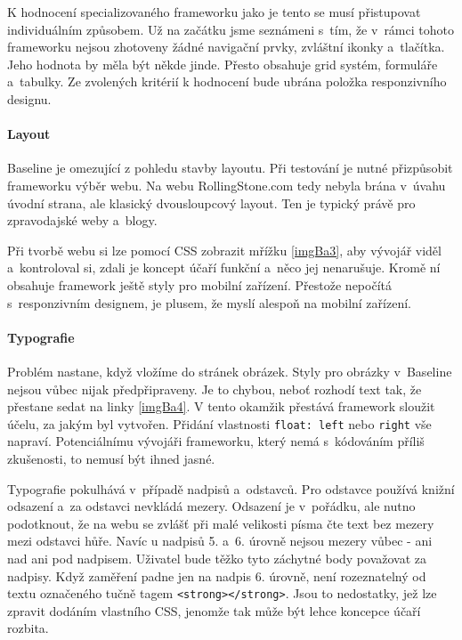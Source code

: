 \documentclass[thesis=B,czech]{FITthesis}[2012/06/26]
\begin{document}
K hodnocení specializovaného frameworku jako je tento se musí přistupovat individuálním způsobem. Už na začátku jsme seznámeni s~tím, že v~rámci tohoto frameworku nejsou zhotoveny žádné navigační prvky, zvláštní ikonky a~tlačítka. Jeho hodnota by měla být někde jinde. Přesto obsahuje grid  systém, formuláře a~tabulky. Ze zvolených kritérií k hodnocení bude ubrána položka responzivního designu.

\paragraph{Layout}

Baseline je omezující z pohledu stavby layoutu. Při testování je nutné přizpůsobit frameworku výběr webu. Na webu RollingStone.com tedy nebyla brána v~úvahu úvodní strana, ale klasický dvousloupcový layout. Ten je typický právě pro zpravodajské weby a~blogy.

Při tvorbě webu si lze pomocí CSS zobrazit mřížku \ref{imgBa3}, aby vývojář viděl a~kontroloval si, zdali je koncept účaří funkční a~něco jej nenarušuje. Kromě ní obsahuje framework ještě styly pro mobilní zařízení. Přestože nepočítá s~responzivním designem, je plusem, že myslí alespoň na mobilní zařízení. 



\paragraph{Typografie}

Problém nastane, když vložíme do stránek obrázek. Styly pro obrázky v~Baseline nejsou vůbec nijak předpřipraveny. Je to chybou, neboť rozhodí text tak, že přestane sedat na linky \ref{imgBa4}. V tento okamžik přestává framework sloužit účelu, za jakým byl vytvořen. Přidání vlastnosti \verb#float: left# nebo \verb#right# vše napraví. Potenciálnímu vývojáři frameworku, který nemá s~kódováním příliš zkušenosti, to nemusí být ihned jasné. 


Typografie pokulhává v~případě nadpisů a~odstavců. Pro odstavce používá knižní odsazení a~za odstavci nevkládá mezery. Odsazení je v~pořádku, ale nutno podotknout, že na webu se zvlášť při malé velikosti písma čte text bez mezery mezi odstavci hůře. Navíc u nadpisů 5. a~6. úrovně nejsou mezery vůbec - ani nad ani pod nadpisem. Uživatel bude těžko tyto záchytné body považovat za nadpisy. Když zaměření padne jen na nadpis 6. úrovně, není rozeznatelný od textu označeného tučně tagem \verb#<strong></strong>#. Jsou to nedostatky, jež lze zpravit dodáním vlastního CSS, jenomže tak může být lehce koncepce účaří rozbita.
\end{document}

